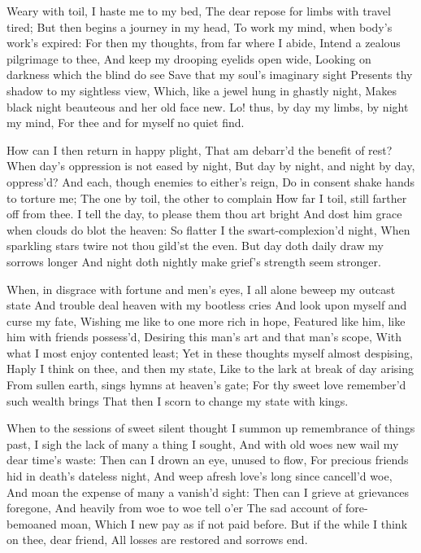 \documentclass[twocolumn]{book}
\begin{document}
Weary with toil, I haste me to my bed,
The dear repose for limbs with travel tired;
But then begins a journey in my head,
To work my mind, when body's work's expired:
For then my thoughts, from far where I abide,
Intend a zealous pilgrimage to thee,
And keep my drooping eyelids open wide,
Looking on darkness which the blind do see
Save that my soul's imaginary sight
\numerus*{}Presents thy shadow to my sightless view,
Which, like a jewel hung in ghastly night,
Makes black night beauteous and her old face new.
  Lo! thus, by day my limbs, by night my mind,
  For thee and for myself no quiet find.


How can I then return in happy plight,
That am debarr'd the benefit of rest?
When day's oppression is not eased by night,
But day by night, and night by day, oppress'd?
\numerus*{}And each, though enemies to either's reign,
Do in consent shake hands to torture me;
The one by toil, the other to complain
How far I toil, still farther off from thee.
I tell the day, to please them thou art bright
And dost him grace when clouds do blot the heaven:
So flatter I the swart-complexion'd night,
When sparkling stars twire not thou gild'st the even.
But day doth daily draw my sorrows longer
  And night doth nightly make grief's strength seem stronger.


When, in disgrace with fortune and men's eyes,
I all alone beweep my outcast state
And trouble deal heaven with my bootless cries
And look upon myself and curse my fate,
Wishing me like to one more rich in hope,
Featured like him, like him with friends possess'd,
Desiring this man's art and that man's scope,
With what I most enjoy contented least;
Yet in these thoughts myself almost despising,
\numerus*{}Haply I think on thee, and then my state,
Like to the lark at break of day arising
From sullen earth, sings hymns at heaven's gate;
  For thy sweet love remember'd such wealth brings
  That then I scorn to change my state with kings.


When to the sessions of sweet silent thought
I summon up remembrance of things past,
I sigh the lack of many a thing I sought,
And with old woes new wail my dear time's waste:
Then can I drown an eye, unused to flow,
For precious friends hid in death's dateless night,
And weep afresh love's long since cancell'd woe,
And moan the expense of many a vanish'd sight:
Then can I grieve at grievances foregone,
And heavily from woe to woe tell o'er
The sad account of fore-bemoaned moan,
Which I new pay as if not paid before.
  But if the while I think on thee, dear friend,
  All losses are restored and sorrows end.
\end{document}
